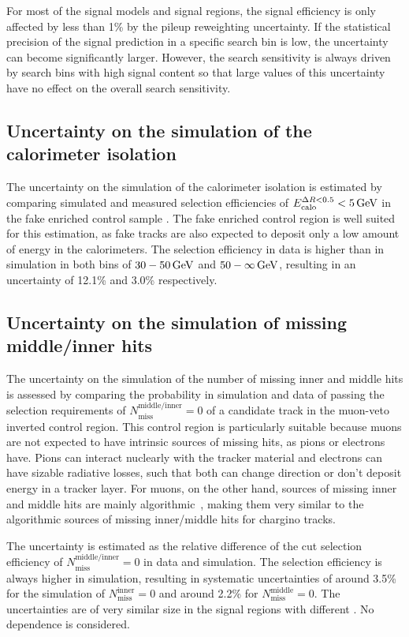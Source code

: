 For most of the signal models and signal regions, the signal efficiency is only affected by less than 1\% by the pileup reweighting uncertainty.
If the statistical precision of the signal prediction in a specific search bin is low, the uncertainty can become significantly larger.
However, the search sensitivity is always driven by search bins with high signal content so that large values of this uncertainty have no effect on the overall search sensitivity.

\subsection*{Uncertainty on the simulation of the calorimeter isolation}
The uncertainty on the simulation of the calorimeter isolation \ecalo is estimated by comparing simulated and measured selection efficiencies of $E^{\Delta R<0.5}_{\text{calo}}<5\,\text{Ge}\kern-0.06667em\text{V}$ in the fake enriched control sample \fakeCR.
The fake enriched control region is well suited for this estimation, as fake tracks are also expected to deposit only a low amount of energy in the calorimeters.
The selection efficiency in data is higher than in simulation in both \pt bins of $30-50\,\text{Ge}\kern-0.06667em\text{V}$ and $50-\infty\,\text{Ge}\kern-0.06667em\text{V}$, resulting in an uncertainty of 12.1\% and 3.0\% respectively.

\subsection*{Uncertainty on the simulation of missing middle/inner hits}
The uncertainty on the simulation of the number of missing inner and middle hits is assessed by comparing the probability in simulation and data of passing the selection requirements of $N_{\text{miss}}^{\text{middle/inner}}=0$
of a candidate track in the muon-veto inverted control region. 
This control region is particularly suitable because muons are not expected to have intrinsic sources of missing hits, as \eg pions or electrons have.
Pions can interact nuclearly with the tracker material and electrons can have sizable radiative losses, such that both can change direction or don't deposit energy in a tracker layer.
For muons, on the other hand, sources of missing inner and middle hits are mainly algorithmic~\cite{bib:CMS:DT_Thesis,bib:CMS:DT_8TeV_AN}, 
making them very similar to the algorithmic sources of missing inner/middle hits for chargino tracks.

The uncertainty is estimated as the relative difference of the cut selection efficiency of $N_{\text{miss}}^{\text{middle/inner}}=0$ in data and simulation.
The selection efficiency is always higher in simulation, resulting in systematic uncertainties of around 3.5\% for the simulation of $N_{\text{miss}}^{\text{inner}}=0$ and around 2.2\% for $N_{\text{miss}}^{\text{middle}}=0$.
The uncertainties are of very similar size in the signal regions with different \pt.
No \ias dependence is considered.

